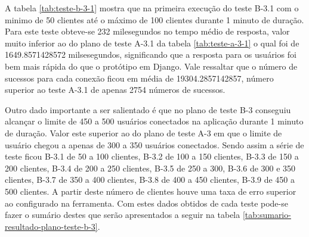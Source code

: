   A tabela \ref{tab:teste-b-3-1} mostra que na primeira execução do teste B-3.1 com o minimo de 50 clientes até o máximo de 100 clientes
  durante 1 minuto de duração. Para este teste obteve-se 232 milesegundos no tempo médio de resposta, valor muito inferior ao do plano de
  teste A-3.1 da tabela \ref{tab:teste-a-3-1} o qual foi de 1649.8571428572 milsesegundos, significando que a resposta para os usuários
  foi bem mais rápida do que o protótipo em Django. Vale ressaltar que o número de sucessos para cada conexão ficou em média de 
  19304.2857142857, número superior ao teste A-3.1 de apenas 2754 números de sucessos.
  
  Outro dado importante a ser salientado é que no plano de teste B-3 conseguiu alcançar o limite de 450 a 500 usuários conectados
  na aplicação durante 1 minuto de duração. Valor este superior ao do plano de teste A-3 em que o limite de usuário chegou a apenas
  de 300 a 350 usuários conectados. Sendo assim a série de teste ficou B-3.1 de 50 a 100 clientes, B-3.2 de 100 a 150 clientes, 
  B-3.3 de 150 a 200 clientes, B-3.4 de 200 a 250 clientes, B-3.5 de 250 a 300, B-3.6 de 300 e 350 clientes, B-3.7 de 350 a 400 clientes,
  B-3.8 de 400 a 450 clientes, B-3.9 de 450 a 500 clientes. A partir deste número de clientes houve uma taxa de erro superior ao
  configurado na ferramenta. Com estes dados obtidos de cada teste pode-se fazer o sumário
  destes que serão apresentados a seguir na tabela \ref{tab:sumario-resultado-plano-teste-b-3}.
  
